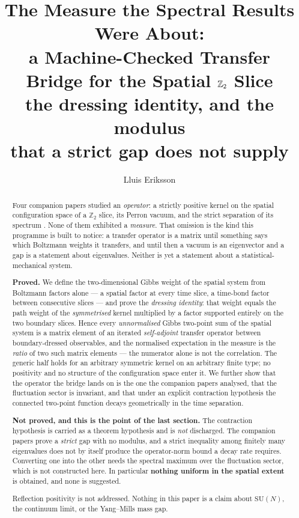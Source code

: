 \documentclass[11pt]{article}
\title{The Measure the Spectral Results Were About:\\
a Machine-Checked Transfer Bridge for the Spatial $\Z_2$ Slice\\
\large the dressing identity, and the modulus\\
that a strict gap does not supply}
\author{Lluis Eriksson}
\date{}
\theoremstyle{definition}
\newcommand{\Z}{\mathbb{Z}}
\newcommand{\SU}{\mathrm{SU}}
\begin{document}
\maketitle

\begin{abstract}
Four companion papers studied an \emph{operator}: a strictly positive kernel on
the spatial configuration space of a $\Z_2$ slice, its Perron vacuum, and the
strict separation of its spectrum \cite{ErikssonSpatial,ErikssonBirkhoff,%
ErikssonPerron,ErikssonGap}.  None of them exhibited a \emph{measure}.  That
omission is the kind this programme is built to notice: a transfer operator is
a matrix until something says which Boltzmann weights it transfers, and until
then a vacuum is an eigenvector and a gap is a statement about eigenvalues.
Neither is yet a statement about a statistical-mechanical system.

\textbf{Proved.}  We define the two-dimensional Gibbs weight of the spatial
system from Boltzmann factors alone --- a spatial factor at every time slice, a
time-bond factor between consecutive slices --- and prove the \emph{dressing
identity}: that weight equals the path weight of the \emph{symmetrised} kernel
multiplied by a factor supported entirely on the two boundary slices.  Hence
every \emph{unnormalised} Gibbs two-point sum of the spatial system is a matrix
element of an iterated \emph{self-adjoint} transfer operator between
boundary-dressed observables, and the normalised expectation in the measure is
the \emph{ratio} of two such matrix elements --- the numerator alone is not the
correlation.  The generic half holds for an arbitrary symmetric kernel on an
arbitrary finite type; no positivity and no structure of the configuration
space enter it.  We further show that the operator the bridge lands on is the
one the companion papers analysed, that the fluctuation sector is invariant,
and that under an explicit contraction hypothesis the connected two-point
function decays geometrically in the time separation.

\textbf{Not proved, and this is the point of the last section.}  The
contraction hypothesis is carried as a theorem hypothesis and is \emph{not}
discharged.  The companion papers prove a \emph{strict} gap with no modulus,
and a strict inequality among finitely many eigenvalues does not by itself
produce the operator-norm bound a decay rate requires.  Converting one into the
other needs the spectral maximum over the fluctuation sector, which is not
constructed here.  In particular \textbf{nothing uniform in the spatial extent}
is obtained, and none is suggested.

Reflection positivity is not addressed.  Nothing in this paper is a claim about
$\SU(N)$, the continuum limit, or the Yang--Mills mass gap.
\end{abstract}
\end{document}
